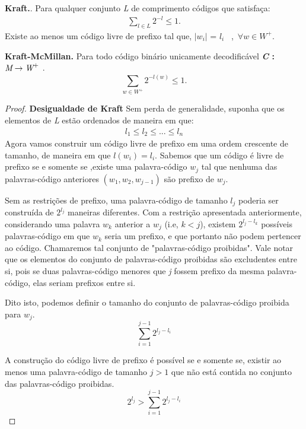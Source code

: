 \begin{lemma} 
\textbf{Kraft.}. Para qualquer conjunto \emph{L} de comprimento códigos que satisfaça:
\begin{align*}
\sum_{l \in L}^{} 2^{-l} \leq 1.
\end{align*}
Existe ao menos um código livre de prefixo tal que, $|w_i|$ = $l_i$ ~,~$\forall w \in W^+$.

\textbf{Kraft-McMillan.} Para todo código binário unicamente decodificável \textbf{\emph{C} : $\emph{M} \rightarrow \emph{W}^+$} .
\begin{equation*}
\sum_{w \in W^+}^{}2^{-l(w)} \leq 1.
\end{equation*}


\begin{proof}

\item \textbf{Desigualdade de Kraft}
Sem perda de generalidade, suponha que os elementos de \emph{L} estão ordenados de maneira em que:
\begin{align*}
l_1 \leq l_2 \leq ... \leq l_n
\end{align*}
Agora vamos construir um código livre de prefixo em uma ordem crescente de tamanho, de maneira em que $l(w_i) = l_i$. Sabemos que um código é livre de prefixo se e somente se ,existe uma palavra-código $w_j$  tal que nenhuma das palavras-código anteriores $(w_1, w_2, w_{j-1})$ são prefixo de $w_j$.

Sem as restrições de prefixo, uma palavra-código de tamanho $l_j$ poderia ser construída de $2^{l_j}$ maneiras diferentes. Com a restrição apresentada anteriormente, considerando uma palavra $w_k$ anterior a $w_j$ (i.e, $k < j$), existem $2^{l_j - l_k}$ possíveis palavras-código em que $w_k$ seria um prefixo, e que portanto não podem pertencer ao código. Chamaremos tal conjunto de "palavras-código proibidas". Vale notar que os elementos do conjunto de palavras-código proibidas são excludentes entre si, pois se duas palavras-código menores que \emph{j} fossem prefixo da mesma palavra-código, elas seriam prefixos entre si. 

Dito isto, podemos definir o tamanho do conjunto de palavras-código proibida para $w_j$.
\begin{equation*}
\sum_{i=1}^{j-1} 2^{l_j - l_i}
\end{equation*}

A construção do código livre de prefixo é possível se e somente se, existir ao menos uma palavra-código de tamanho $j > 1$ que não está contida no conjunto das palavras-código proibidas.
\begin{equation*}
2^{l_j} > \sum_{i=1}^{j-1} 2^{l_j - l_i}
\end{equation*}


\end{proof}
\end{lemma}
